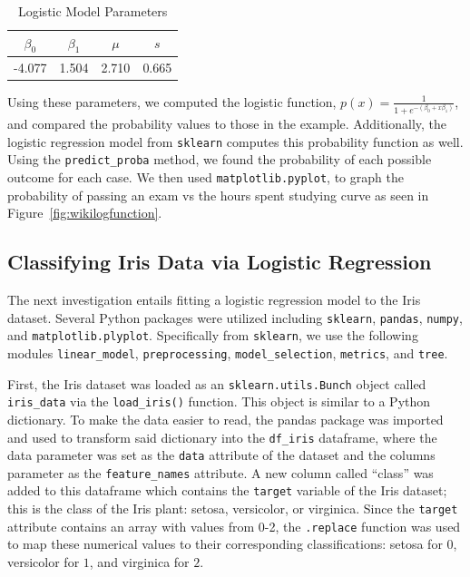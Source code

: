 \documentclass[journal]{IEEEtran}
\begin{document}
\begin{table}[h!]
\centering
\begin{tabular}{c c c c}
    $\beta_0$ & $\beta_1$ &	$\mu$ & \(s\) \\
    \hline
    -4.077	& 1.504	& 2.710 & 0.665 \\
\end{tabular}
\caption{Logistic Model Parameters}
\end{table}

Using these parameters, we computed the logistic function, \( p(x)=\frac{1}{1+e^{-(\beta_0+x\beta_1)}}\), and compared the probability values to those in the example. Additionally, the logistic regression model from \lstinline{sklearn} computes this probability function as well. Using the \lstinline{predict_proba} method, we found the probability of each possible outcome for each case. We then used \lstinline{matplotlib.pyplot}, to graph the probability of passing an exam vs the hours spent studying curve as seen in Figure~\ref{fig:wikilogfunction}. 

\subsection{Classifying Iris Data via Logistic Regression}

The next investigation entails fitting a logistic regression model to the Iris dataset. Several Python packages were utilized including \lstinline{sklearn}, \lstinline{pandas}, \lstinline{numpy}, and \lstinline{matplotlib.plyplot}. Specifically from \lstinline{sklearn}, we use the following modules \lstinline{linear_model}, \lstinline{preprocessing}, \lstinline{model_selection}, \lstinline{metrics}, and \lstinline{tree}. 

First, the Iris dataset was loaded as an \lstinline{sklearn.utils.Bunch} object called \lstinline{iris_data} via the \lstinline{load_iris()} function. This object is similar to a Python dictionary. To make the data easier to read, the pandas package was imported and used to transform said dictionary into the \lstinline{df_iris} dataframe, where the data parameter was set as the \lstinline{data} attribute of the dataset and the columns parameter as the \lstinline{feature_names} attribute. A new column called “class” was added to this dataframe which contains the \lstinline{target} variable of the Iris dataset; this is the class of the Iris plant: setosa, versicolor, or virginica. Since the \lstinline{target} attribute contains an array with values from 0-2, the \lstinline{.replace} function was used to map these numerical values to their corresponding classifications: setosa for \(0\), versicolor for \(1\), and virginica for \(2\). 
\end{document}
